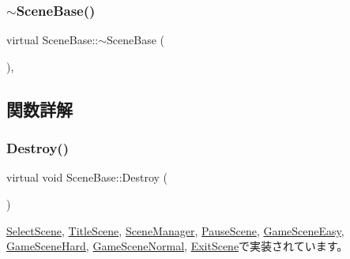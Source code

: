\subsubsection{\texorpdfstring{$\sim$\+Scene\+Base()}{~SceneBase()}}
{\footnotesize\ttfamily virtual Scene\+Base\+::$\sim$\+Scene\+Base (\begin{DoxyParamCaption}{ }\end{DoxyParamCaption})\hspace{0.3cm}{\ttfamily [inline]}, {\ttfamily [virtual]}}



\subsection{関数詳解}
\mbox{\label{class_scene_base_a7c5b54020bc519b4dadfe9770d6b27f7}} 
\subsubsection{\texorpdfstring{Destroy()}{Destroy()}}
{\footnotesize\ttfamily virtual void Scene\+Base\+::\+Destroy (\begin{DoxyParamCaption}{ }\end{DoxyParamCaption})\hspace{0.3cm}{\ttfamily [pure virtual]}}



\mbox{\hyperlink{class_select_scene_a938293516c0e1ae5bb09dbab81bc78d9}{Select\+Scene}}, \mbox{\hyperlink{class_title_scene_adfbc5f934572ede2e36419b089c88fe8}{Title\+Scene}}, \mbox{\hyperlink{class_scene_manager_a0e3ad11342e763f0d4108c0b4674a157}{Scene\+Manager}}, \mbox{\hyperlink{class_pause_scene_a1ff30a4006f7b93f13305b270bc0d913}{Pause\+Scene}}, \mbox{\hyperlink{class_game_scene_easy_aadbe3ec3a28639abca94c7868a0a97df}{Game\+Scene\+Easy}}, \mbox{\hyperlink{class_game_scene_hard_a7a2ddc79c737ede4d1125d352c5756c1}{Game\+Scene\+Hard}}, \mbox{\hyperlink{class_game_scene_normal_a1c06daa1715624eabd199472a37d97cd}{Game\+Scene\+Normal}}, \mbox{\hyperlink{class_exit_scene_afc24a09da4a553109f813566f5d04da8}{Exit\+Scene}}で実装されています。

\mbox{\label{class_scene_base_a24d7db43c819924dc8b07b436f6d3148}} 

